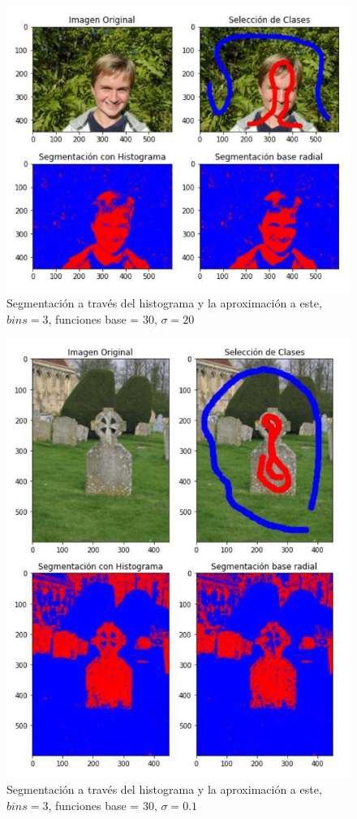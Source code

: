 \documentclass[conference]{IEEEtran}
\begin{document}
\begin{figure}[htbp]
    \centerline{\includegraphics[scale=0.4]{1.jpg}}
    \caption{Segmentación a través del histograma y la aproximación a este, $bins=3$, funciones base = 30, $\sigma=20$}
    \label{img-e3-1}
\end{figure}

\begin{figure}[htbp]
    \centerline{\includegraphics[scale=0.4]{2.jpg}}
    \caption{Segmentación a través del histograma y la aproximación a este, $bins=3$, funciones base = 30, $\sigma=0.1$}
    \label{img-e3-2}
\end{figure}
\end{document}
